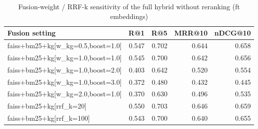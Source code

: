 \begin{table}
\caption{Fusion-weight / RRF-k sensitivity of the full hybrid without reranking (ft embeddings)}
\label{tab:sweep_ft}
\begin{tabular}{lrrrr}
\toprule
Fusion setting & R@1 & R@5 & MRR@10 & nDCG@10 \\
\midrule
faiss+bm25+kg[w\_kg=0.5,boost=1.0] & 0.547 & 0.702 & 0.644 & 0.658 \\
faiss+bm25+kg[w\_kg=1.0,boost=1.0] & 0.545 & 0.700 & 0.642 & 0.656 \\
faiss+bm25+kg[w\_kg=1.0,boost=2.0] & 0.403 & 0.642 & 0.520 & 0.554 \\
faiss+bm25+kg[w\_kg=1.0,boost=3.0] & 0.372 & 0.480 & 0.432 & 0.445 \\
faiss+bm25+kg[w\_kg=2.0,boost=1.0] & 0.370 & 0.630 & 0.496 & 0.535 \\
faiss+bm25+kg[rrf\_k=20] & 0.550 & 0.703 & 0.646 & 0.659 \\
faiss+bm25+kg[rrf\_k=100] & 0.543 & 0.700 & 0.640 & 0.655 \\
\bottomrule
\end{tabular}
\end{table}
